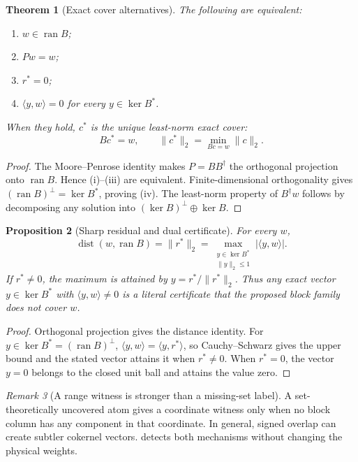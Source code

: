 \documentclass[11pt]{article}
\newtheorem{theorem}{Theorem}[section]
\newtheorem{proposition}[theorem]{Proposition}
\theoremstyle{definition}
\theoremstyle{remark}
\newtheorem{remark}[theorem]{Remark}
\newcommand{\Ran}{\operatorname{ran}}
\newcommand{\Ker}{\operatorname{ker}}
\begin{document}
\begin{theorem}[Exact cover alternatives]
\label{thm:cover}
The following are equivalent:
\begin{enumerate}[label=(\roman*),leftmargin=2em]
\item \(w\in\Ran B\);
\item \(Pw=w\);
\item \(r^*=0\);
\item \(\langle y,w\rangle=0\) for every \(y\in\Ker B^*\).
\end{enumerate}
When they hold, \(c^*\) is the unique least-norm exact cover:
\[
 Bc^*=w,\qquad
 \|c^*\|_2=\min_{Bc=w}\|c\|_2.
\]
\end{theorem}

\begin{proof}
The Moore--Penrose identity makes \(P=BB^\dagger\) the orthogonal
projection onto \(\Ran B\).  Hence (i)--(iii) are equivalent.
Finite-dimensional orthogonality gives
\((\Ran B)^\perp=\Ker B^*\), proving (iv).  The least-norm property of
\(B^\dagger w\) follows by decomposing any solution into
\((\Ker B)^\perp\oplus\Ker B\).
\end{proof}

\begin{proposition}[Sharp residual and dual certificate]
\label{prop:dual}
For every \(w\),
\[
 \boxed{\quad
 \operatorname{dist}(w,\Ran B)=\|r^*\|_2
 =\max_{\substack{y\in\Ker B^*\\\|y\|_2\le1}}
 |\langle y,w\rangle|.
 \quad}
\]
If \(r^*\ne0\), the maximum is attained by
\(y=r^*/\|r^*\|_2\).  Thus any exact vector
\(y\in\Ker B^*\) with \(\langle y,w\rangle\ne0\) is a literal
certificate that the proposed block family does not cover \(w\).
\end{proposition}

\begin{proof}
Orthogonal projection gives the distance identity.  For
\(y\in\Ker B^*=(\Ran B)^\perp\),
\(\langle y,w\rangle=\langle y,r^*\rangle\), so
Cauchy--Schwarz gives the upper bound and the stated vector attains
it when \(r^*\ne0\).  When \(r^*=0\), the vector \(y=0\) belongs to
the closed unit ball and attains the value zero.
\end{proof}

\begin{remark}[A range witness is stronger than a missing-set label]
A set-theoretically uncovered atom gives a coordinate witness only
when no block column has any component in that coordinate.  In
general, signed overlap can create subtler cokernel vectors.
 detects both mechanisms without changing the
physical weights.
\end{remark}
\end{document}
